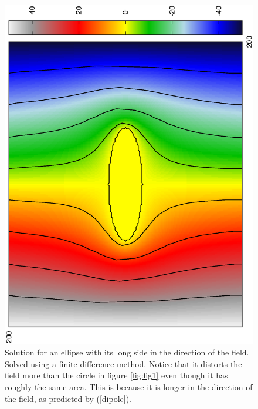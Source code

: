\documentclass[aps,twocolumn,pre,nofootinbib,10pt]{revtex4-1}
\begin{document}
\begin{figure}[h]
\includegraphics*[height=\breite \columnwidth,angle=270]{ellipse.ps} 
\caption{Solution for an ellipse with its long side in the direction of the field. Solved using a finite difference method. Notice that it distorts the field more than the circle in figure \ref{fig:fig1} even though it has roughly the same area. This is because it is longer in the direction of the field, as predicted by (\ref{dipole}).}
\end{figure}
\end{document}
